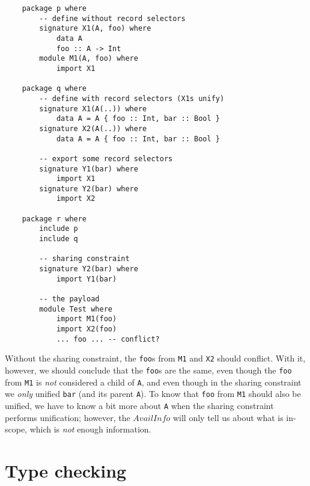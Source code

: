 \documentclass{article}
\newcommand{\I}[1]{\ensuremath{\mathit{#1}}}
\begin{document}
\begin{verbatim}
    package p where
        -- define without record selectors
        signature X1(A, foo) where
            data A
            foo :: A -> Int
        module M1(A, foo) where
            import X1

    package q where
        -- define with record selectors (X1s unify)
        signature X1(A(..)) where
            data A = A { foo :: Int, bar :: Bool }
        signature X2(A(..)) where
            data A = A { foo :: Int, bar :: Bool }

        -- export some record selectors
        signature Y1(bar) where
            import X1
        signature Y2(bar) where
            import X2

    package r where
        include p
        include q

        -- sharing constraint
        signature Y2(bar) where
            import Y1(bar)

        -- the payload
        module Test where
            import M1(foo)
            import X2(foo)
            ... foo ... -- conflict?
\end{verbatim}

Without the sharing constraint, the \verb|foo|s from \verb|M1| and \verb|X2|
should conflict.  With it, however, we should conclude that the \verb|foo|s
are the same, even though the \verb|foo| from \verb|M1| is \emph{not}
considered a child of \verb|A|, and even though in the sharing constraint
we \emph{only} unified \verb|bar| (and its parent \verb|A|).  To know that
\verb|foo| from \verb|M1| should also be unified, we have to know a bit
more about \verb|A| when the sharing constraint performs unification;
however, the \I{AvailInfo} will only tell us about what is in-scope, which
is \emph{not} enough information.


\section{Type checking}
\end{document}
